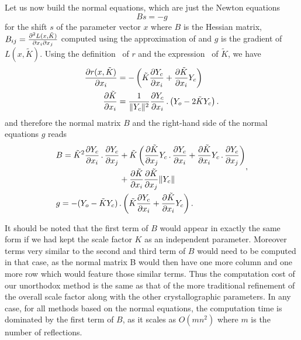 \documentclass{iucr}
\begin{document}
Let us now build the normal equations, which are just the Newton equations 
\begin{equation}
Bs = -g
\end{equation}
for the shift $s$ of the parameter vector $x$ where $B$ is the Hessian matrix, $B_{ij} = \frac{\partial^2 L(x, \tilde{K})}{\partial x_i \partial x_j}$ computed using the approximation of  and $g$ is the gradient of $L(x, \tilde{K})$. Using the definition~ of $r$ and the expression~ of $\tilde{K}$, we have
\begin{align}
\frac{\partial r(x, \tilde{K})}{\partial x_i} &= -\left( \tilde{K}\frac{\partial Y_c}{\partial x_i} + \frac{\partial \tilde{K}}{\partial x_i} Y_c \right) \\
\frac{\partial \tilde{K}}{\partial x_i} &= \frac{1}{\| Y_c \|^2}\frac{\partial Y_c}{\partial x_i} \operatorname{.} \left(Y_o - 2 \tilde{K}Y_c \right).
\end{align}
and therefore the normal matrix $B$ and the right-hand side of the normal equations $g$ reads
\begin{equation}
\begin{aligned}
&\begin{split}
B = \tilde{K}^2\frac{\partial Y_c}{\partial x_i} \operatorname{.} \frac{\partial Y_c}{\partial x_j} 
&+ \tilde{K} \left( \frac{\partial \tilde{K}}{\partial x_j}Y_c \operatorname{.} \frac{\partial Y_c}{\partial x_i}
+ \frac{\partial \tilde{K}}{\partial x_i}Y_c \operatorname{.} \frac{\partial Y_c}{\partial x_j} \right) \\
&+ \frac{\partial \tilde{K}}{\partial x_i}\frac{\partial \tilde{K}}{\partial x_j} \| Y_c \|
\end{split}, \\
&g = - (Y_o - \tilde{K}Y_c) \operatorname{.} \left( \tilde{K}\frac{\partial Y_c}{\partial x_i} + \frac{\partial \tilde{K}}{\partial x_i} Y_c \right).
\end{aligned}
\end{equation}

It should be noted that the first term of $B$ would appear in exactly the same form if we had kept the scale factor $K$ as an independent parameter. Moreover terms very similar to the second and third term of $B$ would need to be computed in that case, as the normal matrix B would then have one more column and one more row which would feature those similar terms. Thus the computation cost of our unorthodox method is the same as that of the more traditional refinement of the overall scale factor along with the other crystallographic parameters. In any case, for all methods based on the normal equations, the computation time is dominated by the first term of $B$, as it scales as $O(mn^2)$ where $m$ is the number of reflections.
\end{document}
